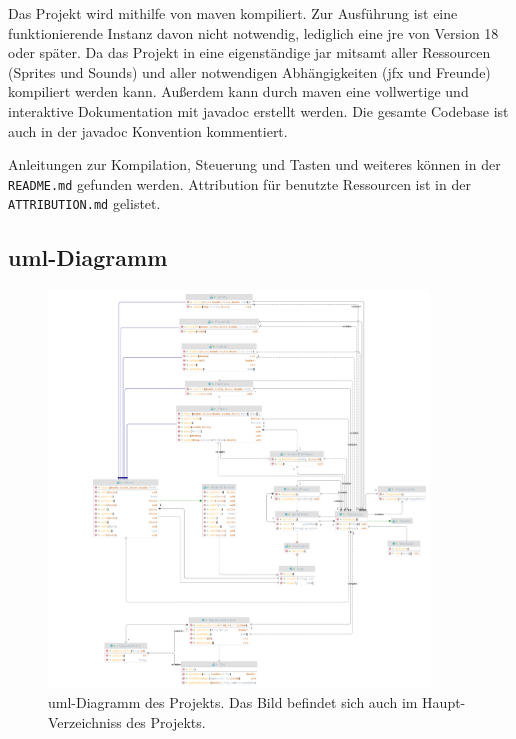 Das Projekt wird mithilfe von \gls{maven} kompiliert.
Zur Ausführung ist eine funktionierende Instanz davon nicht notwendig, lediglich eine \gls{jre} von Version 18 oder später.
Da das Projekt in eine eigenständige \gls{jar} mitsamt aller Ressourcen (Sprites und Sounds) und aller notwendigen Abhängigkeiten (\gls{jfx} und Freunde) kompiliert werden kann.
Außerdem kann durch \gls{maven} eine vollwertige und interaktive Dokumentation mit \gls{javadoc} erstellt werden.
Die gesamte Codebase ist auch in der \gls{javadoc} Konvention kommentiert.

Anleitungen zur Kompilation, Steuerung und Tasten und weiteres können in der \texttt{README.md} gefunden werden.
Attribution für benutzte Ressourcen ist in der \texttt{ATTRIBUTION.md} gelistet.

\subsection{\acrshort{uml}-Diagramm}

\begin{figure}[H]
    \centering
    \includegraphics[width=0.9\textwidth]{../../uml-light.png}
    \caption{\gls{uml}-Diagramm des Projekts. Das Bild befindet sich auch im Haupt-Verzeichniss des Projekts.}
    \label{fig:uml}
\end{figure}

